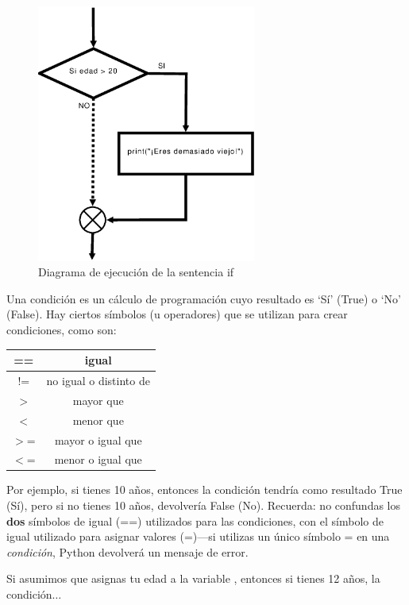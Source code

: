 \begin{figure}
\begin{center}
\includegraphics[width=72mm]{if1.eps}
\end{center}
\caption{Diagrama de ejecución de la sentencia if}\label{if1}
\end{figure}

\par
Una condición es un cálculo de programación cuyo resultado es `Sí' (True) o `No' (False).  Hay ciertos símbolos (u operadores) que se utilizan para crear condiciones, como son:

\begin{center}
\begin{tabular}{|c|c|}
\hline
== & igual \\
\hline
!= & no igual o distinto de \\
\hline
$>$ & mayor que \\
\hline
$<$ & menor que \\
\hline
$>$= & mayor o igual que \\
\hline
$<$= & menor o igual que \\
\hline
\end{tabular}
\end{center}

Por ejemplo, si tienes 10 años, entonces la condición  tendría como resultado True (Sí), pero si no tienes 10 años, devolvería False (No).  Recuerda: no confundas los \textbf{dos} símbolos de igual (==) utilizados para las condiciones, con el símbolo de igual utilizado para asignar valores (=)---si utilizas un único símbolo = en una \emph{condición}, Python devolverá un mensaje de error.
\par
Si asumimos que asignas tu edad a la variable , entonces si tienes 12 años, la condición$\ldots$

